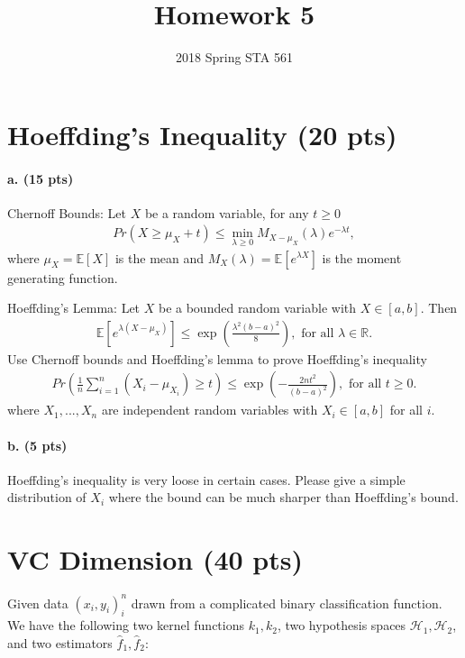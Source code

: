 \documentclass[11pt]{article}
\newcommand{\Hcal}{\mathcal{H}}
\begin{document}
\title{Homework 5}

\author{2018 Spring STA 561}

\maketitle
\section{Hoeffding’s Inequality (20 pts)}
\paragraph{a. (15 pts)} Chernoff Bounds: Let $X$ be a random variable, for any $t\geq0$
\begin{align*}
	Pr(X\geq\mu_X+t)\leq\min_{\lambda\geq 0}M_{X-\mu_X}(\lambda)e^{-\lambda t},
\end{align*}
where $\mu_X=\mathbb{E}[X]$ is the mean and $M_X(\lambda)=\mathbb{E}[e^{\lambda X}]$ is the moment generating function.

Hoeffding's Lemma: Let $X$ be a bounded random variable with $X\in[a,b]$. Then
\begin{align*}
\mathbb{E}[e^{\lambda(X-\mu_X)}]\leq\exp(\frac{\lambda^2(b-a)^2}{8}), \text{ for all }\lambda\in\mathbb{R}.
\end{align*}
Use Chernoff bounds and Hoeffding's lemma to prove Hoeffding's inequality
\begin{align*}
Pr(\frac{1}{n}\sum_{i=1}^{n}(X_i-\mu_{X_i})\geq t)\leq \exp(-\frac{2nt^2}{(b-a)^2}), \text{ for all } t\geq 0.
\end{align*}
where $X_1,...,X_n$ are independent random variables with $X_i\in[a,b]$ for all $i$.

\paragraph{b. (5 pts)} Hoeffding's inequality is very loose in certain cases. Please give a simple distribution of $X_i$ where the bound can be much sharper than Hoeffding's bound.

\section{VC Dimension (40 pts)}

Given data $(x_i,y_i)_i^n$ drawn from a complicated binary classification function. We have the following two kernel functions $k_1, k_2$, two hypothesis spaces $\Hcal_1,\Hcal_2$, and two estimators $\hat{f}_1,\hat{f}_2$:
\end{document}
